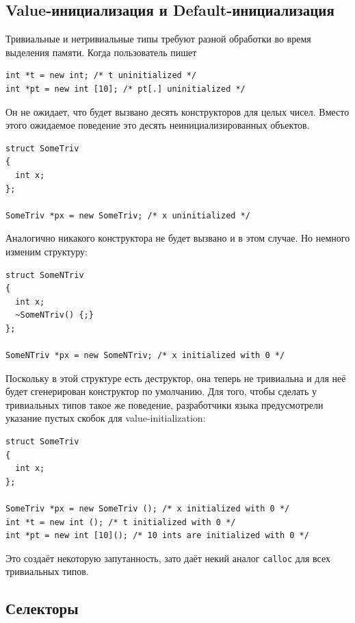 \documentclass[a4paper,12pt,oneside]{book}
\begin{document}
\subsection{Value-инициализация и Default-инициализация}\label{ValDefInit}

Тривиальные и нетривиальные типы требуют разной обработки во время выделения памяти. Когда пользователь пишет

\begin{lstlisting}
int *t = new int; /* t uninitialized */
int *pt = new int [10]; /* pt[.] uninitialized */
\end{lstlisting}

Он не ожидает, что будет вызвано десять конструкторов для целых чисел. Вместо этого ожидаемое поведение это десять неинициализированных объектов.

\begin{lstlisting}
struct SomeTriv
{
  int x;
};

SomeTriv *px = new SomeTriv; /* x uninitialized */
\end{lstlisting}

Аналогично никакого конструктора не будет вызвано и в этом случае. Но немного изменим структуру:

\begin{lstlisting}
struct SomeNTriv
{
  int x;
  ~SomeNTriv() {;}
};

SomeNTriv *px = new SomeNTriv; /* x initialized with 0 */
\end{lstlisting}

Поскольку в этой структуре есть деструктор, она теперь не тривиальна и для неё будет сгенерирован конструктор по умолчанию. Для того, чтобы сделать у тривиальных типов такое же поведение, разработчики языка предусмотрели указание пустых скобок для value-initialization:

\begin{lstlisting}
struct SomeTriv
{
  int x;
};

SomeTriv *px = new SomeTriv (); /* x initialized with 0 */
int *t = new int (); /* t initialized with 0 */
int *pt = new int [10](); /* 10 ints are initialized with 0 */
\end{lstlisting}

Это создаёт некоторую запутанность, зато даёт некий аналог \lstinline!calloc! для всех тривиальных типов. 

\subsection{Селекторы}\label{Selectors}
\end{document}
